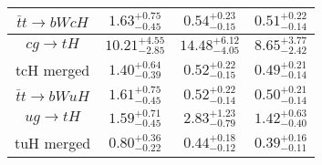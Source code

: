 \begin{tabular}{|c|c|c|c|}
$\bar{t}t\to bWcH$ & $1.63^{+0.75}_{-0.45}$ & $0.54^{+0.23}_{-0.15}$ & $0.51^{+0.22}_{-0.14}$\\\hline
$cg\to tH$ & $10.21^{+4.55}_{-2.85}$ & $14.48^{+6.12}_{-4.05}$ & $8.65^{+3.77}_{-2.42}$\\\hline
tcH merged & $1.40^{+0.64}_{-0.39}$ & $0.52^{+0.22}_{-0.15}$ & $0.49^{+0.21}_{-0.14}$\\\hline
$\bar{t}t\to bWuH$ & $1.61^{+0.75}_{-0.45}$ & $0.52^{+0.22}_{-0.14}$ & $0.50^{+0.21}_{-0.14}$\\\hline
$ug\to tH$ & $1.59^{+0.71}_{-0.45}$ & $2.83^{+1.23}_{-0.79}$ & $1.42^{+0.63}_{-0.40}$\\\hline
tuH merged & $0.80^{+0.36}_{-0.22}$ & $0.44^{+0.18}_{-0.12}$ & $0.39^{+0.16}_{-0.11}$\\\hline
\end{tabular}
